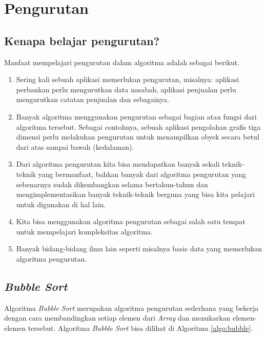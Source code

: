 \chapter{Pengurutan}

\section{Kenapa belajar pengurutan?}
Manfaat mempelajari pengurutan dalam algoritma adalah sebagai berikut.
\begin{enumerate}
	\item Sering kali sebuah aplikasi memerlukan pengurutan, misalnya: aplikasi perbankan perlu mengurutkan data nasabah, aplikasi penjualan perlu mengurutkan catatan penjualan dan sebagainya.
	\item Banyak algoritma menggunakan pengurutan sebagai bagian atau fungsi dari algoritma tersebut. Sebagai contohnya, sebuah aplikasi pengolahan grafis tiga dimensi perlu melakukan pengurutan untuk menampilkan obyek secara betul dari atas sampai bawah (kedalaman).
	\item Dari algoritma pengurutan kita bisa mendapatkan banyak sekali teknik-teknik yang bermanfaat, bahkan banyak dari algoritma pengurutan yang sebenarnya sudah dikembangkan selama bertahun-tahun dan mengimplementasikan banyak teknik-teknik berguna yang bisa kita pelajari untuk digunakan di hal lain.
	\item Kita bisa menggunakan algoritma pengurutan sebagai salah satu tempat untuk mempelajari kompleksitas algoritma.
	\item Banyak bidang-bidang ilmu lain seperti misalnya basis data yang memerlukan algoritma pengurutan.
\end{enumerate}

\section{\textit{Bubble Sort}}
Algoritma \textit{Bubble Sort} merupakan algoritma pengurutan sederhana yang bekerja dengan cara membandingkan setiap elemen dari \textit{Array} dan menukarkan elemen-elemen tersebut. Algoritma \textit{Bubble Sort} bisa dilihat di Algoritma \ref{algo:bubble}.

